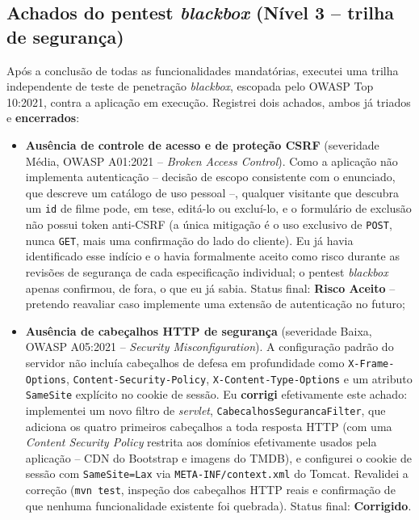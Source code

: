 \documentclass[12pt,a4paper]{article}
\begin{document}
\subsection{Achados do pentest \textit{blackbox} (Nível 3 -- trilha de segurança)}

Após a conclusão de todas as funcionalidades mandatórias, executei uma trilha independente de
teste de penetração \textit{blackbox}, escopada pelo OWASP Top 10:2021, contra a aplicação em
execução. Registrei dois achados,
ambos já triados e \textbf{encerrados}:

\begin{itemize}
    \item \textbf{Ausência de controle de acesso e de proteção CSRF} (severidade Média,
        OWASP A01:2021 -- \textit{Broken Access Control}). Como a aplicação não implementa
        autenticação -- decisão de escopo consistente com o enunciado, que descreve um catálogo
        de uso pessoal --, qualquer visitante que descubra um \texttt{id} de filme pode, em
        tese, editá-lo ou excluí-lo, e o formulário de exclusão não possui token anti-CSRF (a
        única mitigação é o uso exclusivo de \texttt{POST}, nunca \texttt{GET}, mais uma
        confirmação do lado do cliente). Eu já havia identificado esse indício e o havia
        formalmente aceito como risco durante as revisões de segurança de cada especificação
        individual; o pentest \textit{blackbox} apenas confirmou, de fora, o que eu já sabia.
        Status final: \textbf{Risco Aceito} -- pretendo reavaliar caso implemente uma extensão
        de autenticação no futuro;
    \item \textbf{Ausência de cabeçalhos HTTP de segurança} (severidade Baixa, OWASP A05:2021 --
        \textit{Security Misconfiguration}). A configuração padrão do servidor não incluía
        cabeçalhos de defesa em profundidade como \texttt{X-Frame-Options},
        \texttt{Content-Security-Policy}, \texttt{X-Content-Type-Options} e um atributo
        \texttt{SameSite} explícito no cookie de sessão. Eu \textbf{corrigi} efetivamente este
        achado: implementei um novo filtro de \textit{servlet},  \texttt{CabecalhosSegurancaFilter},
        que adiciona os quatro primeiros cabeçalhos a toda resposta HTTP (com uma
        \textit{Content Security Policy} restrita aos domínios efetivamente usados pela
        aplicação -- CDN do Bootstrap e imagens do TMDB), e configurei o cookie de sessão com
        \texttt{SameSite=Lax} via \texttt{META-INF/context.xml} do Tomcat. Revalidei a correção
        (\texttt{mvn test}, inspeção dos cabeçalhos HTTP reais e confirmação de que nenhuma
        funcionalidade existente foi quebrada). Status final: \textbf{Corrigido}.
\end{itemize}
\end{document}
